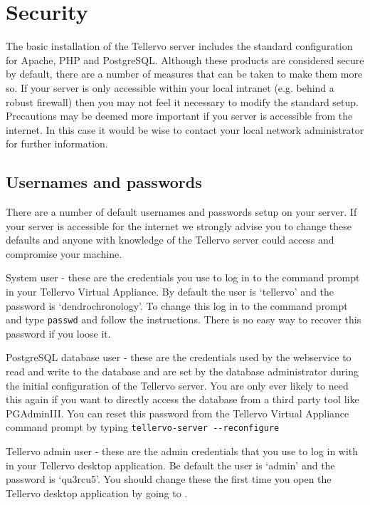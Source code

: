 
\section{Security}
The basic installation of the Tellervo server includes the standard configuration for Apache, PHP and PostgreSQL.  Although these products are considered secure by default, there are a number of measures that can be taken to make them more so.  If your server is only accessible within your local intranet (e.g. behind a robust firewall) then you may not feel it necessary to modify the standard setup.  Precautions may be deemed more important if you server is accessible from the internet.  In this case it would be wise to contact your local network administrator for further information.

\subsection{Usernames and passwords}
\label{txt:passwords}
There are a number of default usernames and passwords setup on your server.  If your server is accessible for the internet we strongly advise you to change these defaults and anyone with knowledge of the Tellervo server could access and compromise your machine.

\begin{description*}
 \item[System user] - these are the credentials you use to log in to the command prompt in your Tellervo Virtual Appliance.  By default the user is `tellervo' and the password is `dendrochronology'.  To change this log in to the command prompt and type \verb|passwd| and follow the instructions.  There is no easy way to recover this password if you loose it.
 \item[PostgreSQL database user] - these are the credentials used by the webservice to read and write to the database and are set by the database administrator during the initial configuration of the Tellervo server. You are only ever likely to need this again if you want to directly access the database from a third party tool like PGAdminIII.  You can reset this password from the Tellervo Virtual Appliance command prompt by typing \verb|tellervo-server --reconfigure|
 \item[Tellervo admin user] - these are the admin credentials that you use to log in with in your Tellervo desktop application.  Be default the user is `admin' and the password is `qu3rcu5'.  You should change these the first time you open the Tellervo desktop application by going to .
\end{description*}

